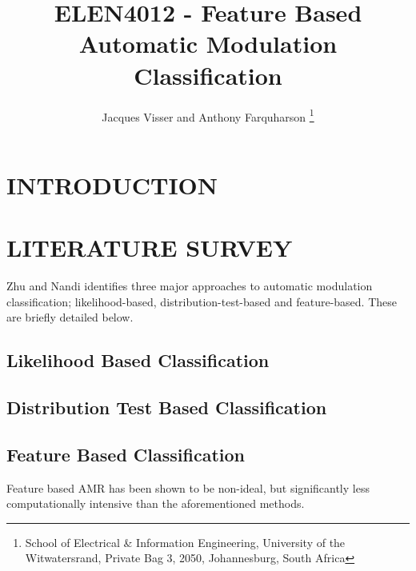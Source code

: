 \documentclass[10pt,twocolumn]{witseiepaper}
\begin{document}
\title{ELEN4012 - Feature Based Automatic Modulation Classification}

\author{Jacques Visser and Anthony Farquharson
\thanks{School of Electrical \& Information Engineering, University of the
Witwatersrand, Private Bag 3, 2050, Johannesburg, South Africa}
}



\maketitle
\thispagestyle{empty}\pagestyle{empty}

\section{INTRODUCTION}

\section{LITERATURE SURVEY}
Zhu and Nandi \cite{zhu2014automatic} identifies three major approaches to automatic modulation classification; likelihood-based, distribution-test-based and feature-based. These are briefly detailed below.
	\subsection{Likelihood Based Classification}
	\subsection{Distribution Test Based Classification}
	\subsection{Feature Based Classification}
	\label{sec:features}
	Feature based AMR has been shown to be non-ideal, but significantly less computationally intensive \cite{zhu2014automatic} than the aforementioned methods.
\end{document}
